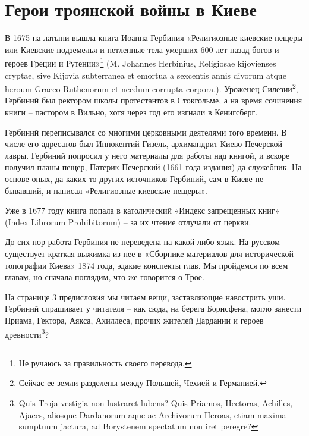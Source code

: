 \chapter{Герои троянской войны в Киеве}

В 1675 на латыни вышла книга Иоанна Гербиния  «Религиозные киевские пещеры или Киевские подземелья и нетленные тела умерших 600 лет назад богов и героев Греции и Рутении»\footnote{Не ручаюсь за правильность своего перевода.} (M. Johannes Herbinius, Religiosae kijovienses cryptae, sive Kijovia subterranea et emortua a sexcentis annis divorum atque heroum Graeco-Ruthenorum et necdum corrupta corpora.). Уроженец Силезии\footnote{Сейчас ее земли разделены между Польшей, Чехией и Германией.}, Гербиний был ректором школы протестантов в Стокгольме, а на время сочинения книги – пастором в Вильно, хотя через год его изгнали в Кенигсберг. 

Гербиний переписывался со многими церковными деятелями того времени. В числе его адресатов был Иннокентий Гизель, архимандрит Киево-Печерской лавры. Гербиний попросил у него материалы для работы над книгой, и вскоре получил планы пещер, Патерик Печерский (1661 года издания) да служебник. На основе оных, да каких-то других источников Гербиний, сам в Киеве не бывавший, и написал «Религиозные киевские пещеры».

Уже в 1677 году книга попала в католический «Индекс запрещенных книг» (Index Librorum Prohibitorum) – за их чтение отлучали от церкви.

До сих пор работа Гербиния не переведена на какой-либо язык. На русском существует краткая выжимка из нее в «Сборнике материалов для исторической топографии Киева» 1874 года, эдакие конспекты глав. Мы пройдемся по всем главам, но сначала поглядим, что же говорится о Трое.

На странице 3 предисловия мы читаем вещи, заставляющие навострить уши. Гербиний спрашивает у читателя – как сюда, на берега Борисфена, могло занести Приама, Гектора, Аякса, Ахиллеса, прочих жителей Дардании и героев древности\footnote{Quis Troja vestigia non lustraret lubens? Quis Priamos, Hectoras, Achilles, Ajaces, aliosque Dardanorum aque ac Archivorum Heroas, etiam maxima sumptuum jactura, ad Borystenem spectatum non iret peregre?}?

